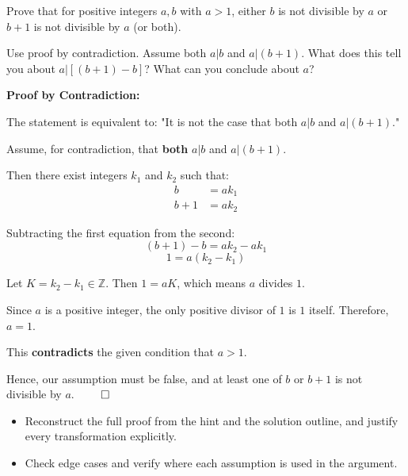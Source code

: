 
\begin{problem}
Prove that for positive integers $a, b$ with $a > 1$, either $b$ is not divisible by $a$ or $b + 1$ is not divisible by $a$ (or both).
\end{problem}

\begin{hint}
Use proof by contradiction. Assume both $a|b$ and $a|(b+1)$. What does this tell you about $a|[(b+1) - b]$? What can you conclude about $a$?
\end{hint}

\begin{solution}
\textbf{Proof by Contradiction:}

The statement is equivalent to: "It is not the case that both $a|b$ and $a|(b+1)$."

Assume, for contradiction, that \textbf{both} $a|b$ and $a|(b+1)$.

Then there exist integers $k_1$ and $k_2$ such that:
\begin{align*}
b &= ak_1 \\
b + 1 &= ak_2
\end{align*}

Subtracting the first equation from the second:
\[
(b+1) - b = ak_2 - ak_1
\]
\[
1 = a(k_2 - k_1)
\]

Let $K = k_2 - k_1 \in \mathbb{Z}$. Then $1 = aK$, which means $a$ divides $1$.

Since $a$ is a positive integer, the only positive divisor of $1$ is $1$ itself. Therefore, $a = 1$.

This \textbf{contradicts} the given condition that $a > 1$.

Hence, our assumption must be false, and at least one of $b$ or $b+1$ is not divisible by $a$. $\qed$
\end{solution}

\begin{takeaways}
\begin{itemize}[leftmargin=*]
\item Reconstruct the full proof from the hint and the solution outline, and justify every transformation explicitly.
\item Check edge cases and verify where each assumption is used in the argument.
\end{itemize}
\end{takeaways}
